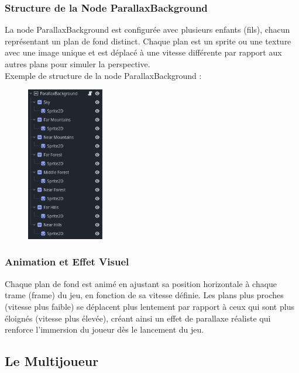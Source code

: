       \subsubsection*{Structure de la Node ParallaxBackground}
      La node ParallaxBackground est configurée avec plusieurs enfants (fils), chacun représentant un plan de fond distinct.
      Chaque plan est un sprite ou une texture avec une image unique et est déplacé à une vitesse différente par rapport aux autres plans pour simuler la perspective.
      \\

      Exemple de structure de la node ParallaxBackground :
      \\

      \begin{figure}[H]
            \centering
            \includegraphics[width=0.3\textwidth]{assets/paralax.png}
            
            \label{fig:website1}
        \end{figure}

      \subsubsection*{Animation et Effet Visuel}
      Chaque plan de fond est animé en ajustant sa position horizontale à chaque trame (frame) du jeu, en fonction de sa vitesse définie.
      Les plans plus proches (vitesse plus faible) se déplacent plus lentement par rapport à ceux qui sont plus éloignés (vitesse plus élevée), 
      créant ainsi un effet de parallaxe réaliste qui renforce l'immersion du joueur dès le lancement du jeu.
      \\
      \subsection{Le Multijoueur}


